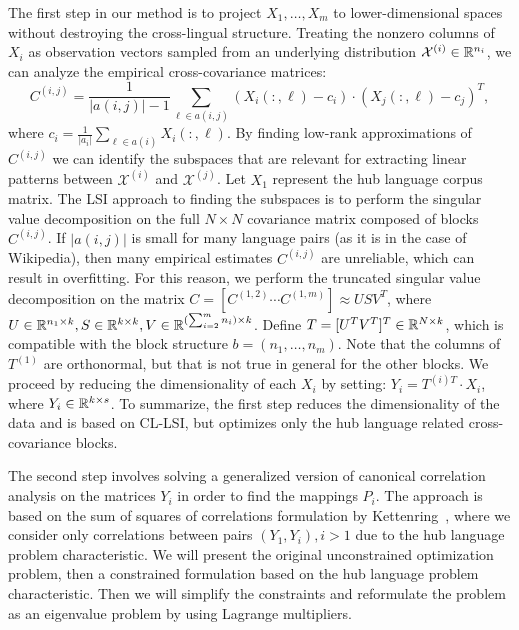 The first step in our method is to project $X_1, \ldots, X_m$ to lower-dimensional spaces
without destroying the cross-lingual structure. Treating the nonzero columns of $X_i$ as
observation vectors sampled from an underlying distribution $\mathcal{X}^{(i)} \in \mathbb{R}^{n_i}$,
we can analyze the empirical cross-covariance matrices:
$$C^{(i,j)} = \frac{1}{|a(i,j)|-1 }\sum_{\ell \in a(i,j)} (X_i(:,\ell) - c_i)\cdot (X_j(:,\ell) - c_j)^T,$$
where $c_i = \frac{1}{|a_i|} \sum_{\ell \in a(i)}X_i(:,\ell)$. By finding low-rank
approximations of $C^{(i,j)}$ we can identify the subspaces that are
relevant for extracting linear patterns between $\mathcal{X}^{(i)}$ and $\mathcal{X}^{(j)}$.
Let $X_1$ represent the hub language corpus matrix. The LSI approach to finding the subspaces
is to perform the singular value decomposition on the full $N \times N$ covariance matrix
composed of blocks $C^{(i,j)}$. If $|a(i,j)|$ is small for many language pairs (as it is in the
case of Wikipedia), then many empirical estimates $C^{(i,j)}$ are unreliable, which can result
in overfitting. For this reason, we perform the truncated singular value decomposition on the
matrix $C = [C^{(1,2)}  \cdots  C^{(1,m)}] \approx U S V^T$, where
$U \in \mathbb{R}^{n_1 \times k}, S \in \mathbb{R}^{k \times k}, V \in \mathbb{R}^{(\sum_{i=2}^m n_i) \times k}$.
Define $T = [U^T V^T]^T \in \mathbb{R}^{N \times k}$, which is compatible with the block structure $b = (n_1, \ldots, n_m)$.
Note that the columns of $T^{(1)}$ are orthonormal, but that is not true in general for the other blocks.
We proceed by reducing the dimensionality of each $X_i$ by
setting: $Y_i = T^{(i)T} \cdot X_i$, where $Y_i \in \mathbb{R}^{k\times s}$. To summarize, the first step
reduces the dimensionality of the data and is based on CL-LSI, but optimizes only the hub language
related cross-covariance blocks.

The second step involves solving a generalized version of canonical correlation analysis on the
matrices $Y_i$ in order to find the mappings $P_i$. The approach is based on the sum of
squares of correlations formulation by Kettenring~\cite{Kettenring}, where we consider only
correlations between pairs $(Y_1, Y_i), i >1$ due to the hub language problem characteristic.
We will present the original unconstrained optimization problem, then a constrained formulation
based on the hub language problem characteristic. Then we will simplify the constraints and
reformulate the problem as an eigenvalue problem by using Lagrange multipliers.

